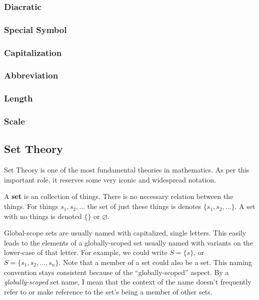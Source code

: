 \documentclass{article}
\newcommand{\definition}[1]{
	\vspace{10px}
	\noindent {[\sc Definition]} #1
	\vspace{10px}
}
\begin{document}
\subsubsection{Diacratic}
	

\subsubsection{Special Symbol}
\subsubsection{Capitalization}
\subsubsection{Abbreviation}
\subsubsection{Length}
\subsubsection{Scale}

\subsection{Set Theory}

	Set Theory is one of the most fundamental theories in mathematics. As per this important role, it reserves some very iconic and widespread notation.

	\definition{A \textbf{set} is an collection of things. There is no necessary relation between the things. For things $s_1, s_2, \dots$ the set of just these things is denotes $\{ s_1, s_2, \dots \}$. A set with no things is denoted $\{\}$ or $\varnothing$.}

	Global-scope sets are usually named with capitalized, single letters. This easily leads to the elements of a globally-scoped set usually named with variants on the lower-case of that letter. For example, we could write $S = \{ s \}$, or $S = \{ s_1, s_2, \dots, s_n \}$. Note that a member of a set could also be a set. This naming convention stays consistent because of the ``globally-scoped'' aspect. By a \textit{globally-scoped} set name, I mean that the context of the name doesn't frequently refer to or make reference to the set's being a member of other sets.
\end{document}
